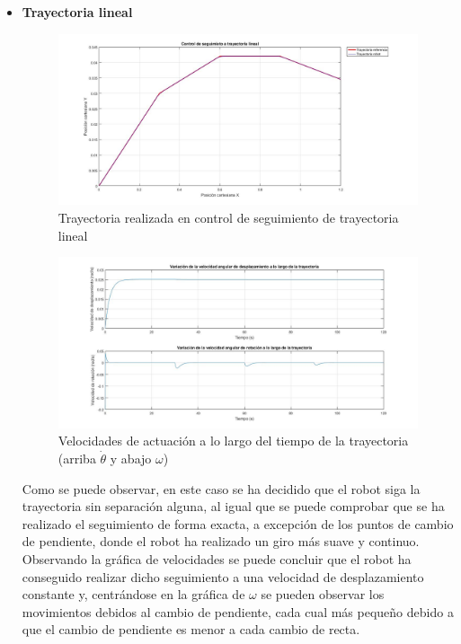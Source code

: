 \documentclass[a4paper,twoside]{article}
\begin{document}
	\begin{itemize}
		\item \textbf{Trayectoria lineal}
		\begin{figure}[H]
			\centering
			\includegraphics[width=1\textwidth]{control_tray_1}
			\caption{Trayectoria realizada en control de seguimiento de trayectoria lineal}
		\end{figure}
		\begin{figure}[H]
			\centering
			\includegraphics[width=1\textwidth]{control_tray_1_2}
			\caption{Velocidades de actuación a lo largo del tiempo de la trayectoria (arriba $\dot{\theta}$ y abajo $\omega$)}
		\end{figure}
		Como se puede observar, en este caso se ha decidido que el robot siga la trayectoria sin separación alguna, al igual que se puede comprobar que se ha realizado el seguimiento de forma exacta, a excepción de los puntos de cambio de pendiente, donde el robot ha realizado un giro más suave y continuo.\\
		Observando la gráfica de velocidades se puede concluir que el robot ha conseguido realizar dicho seguimiento a una velocidad de desplazamiento constante y, centrándose en la gráfica de $\omega$ se pueden observar los movimientos debidos al cambio de pendiente, cada cual más pequeño debido a que el cambio de pendiente es menor a cada cambio de recta.\\
		

\end{itemize}
\end{document}
